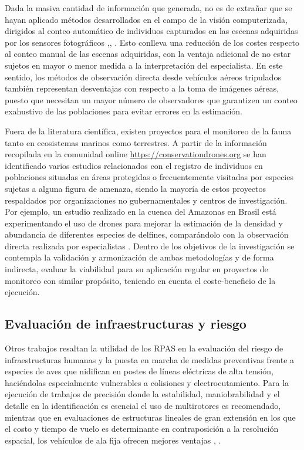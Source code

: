 \documentclass[9t,twocolumn]{article}
\begin{document}
Dada la masiva cantidad de información que generada, no es de extrañar
que se hayan aplicado métodos desarrollados en el campo de la visión
computerizada, dirigidos al conteo automático de individuos capturados
en las escenas adquiridas por los sensores fotográficos
\citep{Lhoest2015},\citep{Abd-Elrahman2005a}, \citep{VanGemert2015}.
Esto conlleva una reducción de los costes respecto al conteo manual de
las escenas adquiridas, con la ventaja adicional de no estar sujetos en
mayor o menor medida a la interpretación del especialista. En este
sentido, los métodos de observación directa desde vehículos aéreos
tripulados también representan desventajas con respecto a la toma de
imágenes aéreas, puesto que necesitan un mayor número de observadores
que garantizen un conteo exahustivo de las poblaciones para evitar
errores en la estimación.

Fuera de la literatura científica, existen proyectos para el monitoreo
de la fauna tanto en ecosistemas marinos como terrestres. A partir de la
información recopilada en la comunidad online
\url{https://conservationdrones.org} se han identificado varios estudios
relacionados con el registro de individuos en poblaciones situadas en
áreas protegidas o frecuentemente visitadas por especies sujetas a
alguna figura de amenaza, siendo la mayoría de estos proyectos
respaldados por organizaciones no gubernamentales y centros de
investigación. Por ejemplo, un estudio realizado en la cuenca del
Amazonas en Brasil está experimentando el uso de drones para mejorar la
estimación de la densidad y abundancia de diferentes especies de
delfines, comparándolo con la observación directa realizada por
especialistas \citep{WichS2017}. Dentro de los objetivos de la
investigación se contempla la validación y armonización de ambas
metodologías y de forma indirecta, evaluar la viabilidad para su
aplicación regular en proyectos de monitoreo con similar propósito,
teniendo en cuenta el coste-beneficio de la ejecución.

\subsection{Evaluación de infraestructuras y
riesgo}\label{evaluacion-de-infraestructuras-y-riesgo}

Otros trabajos resaltan la utilidad de los RPAS en la evaluación del
riesgo de infraestructuras humanas y la puesta en marcha de medidas
preventivas frente a especies de aves que nidifican en postes de líneas
eléctricas de alta tensión, haciéndolas especialmente vulnerables a
colisiones y electrocutamiento. Para la ejecución de trabajos de
precisión donde la estabilidad, maniobrabilidad y el detalle en la
identificación es esencial \citep{Lobermeier2015} el uso de multirotores
es recomendado, mientras que en evaluaciones de estructuras lineales de
gran extensión en los que el costo y tiempo de vuelo es determinante en
contraposición a la resolución espacial, los vehículos de ala fija
ofrecen mejores ventajas \citep{Mulero-Pazmany2014a}, \citep{Zhang2016}.
\end{document}
